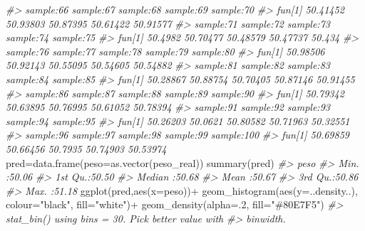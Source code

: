 \documentclass[
]{book}
\newenvironment{Shaded}{\begin{snugshade}}{\end{snugshade}}
\newcommand{\AttributeTok}[1]{\textcolor[rgb]{0.77,0.63,0.00}{#1}}
\newcommand{\CommentTok}[1]{\textcolor[rgb]{0.56,0.35,0.01}{\textit{#1}}}
\newcommand{\DecValTok}[1]{\textcolor[rgb]{0.00,0.00,0.81}{#1}}
\newcommand{\FunctionTok}[1]{\textcolor[rgb]{0.00,0.00,0.00}{#1}}
\newcommand{\NormalTok}[1]{#1}
\newcommand{\OtherTok}[1]{\textcolor[rgb]{0.56,0.35,0.01}{#1}}
\newcommand{\SpecialCharTok}[1]{\textcolor[rgb]{0.00,0.00,0.00}{#1}}
\newcommand{\StringTok}[1]{\textcolor[rgb]{0.31,0.60,0.02}{#1}}
\begin{document}
\begin{Shaded}
\begin{Highlighting}[]
\CommentTok{\#\textgreater{}        sample:66 sample:67 sample:68 sample:69 sample:70}
\CommentTok{\#\textgreater{} fun[1]  50.41452  50.93803  50.87395  50.61422  50.91577}
\CommentTok{\#\textgreater{}        sample:71 sample:72 sample:73 sample:74 sample:75}
\CommentTok{\#\textgreater{} fun[1]   50.4982  50.70477  50.48579  50.47737    50.434}
\CommentTok{\#\textgreater{}        sample:76 sample:77 sample:78 sample:79 sample:80}
\CommentTok{\#\textgreater{} fun[1]  50.98506  50.92143  50.55095  50.54605  50.54882}
\CommentTok{\#\textgreater{}        sample:81 sample:82 sample:83 sample:84 sample:85}
\CommentTok{\#\textgreater{} fun[1]  50.28867  50.88754  50.70405  50.87146  50.91455}
\CommentTok{\#\textgreater{}        sample:86 sample:87 sample:88 sample:89 sample:90}
\CommentTok{\#\textgreater{} fun[1]  50.79342  50.63895  50.76995  50.61052  50.78394}
\CommentTok{\#\textgreater{}        sample:91 sample:92 sample:93 sample:94 sample:95}
\CommentTok{\#\textgreater{} fun[1]  50.26203   50.0621  50.80582  50.71963  50.32551}
\CommentTok{\#\textgreater{}        sample:96 sample:97 sample:98 sample:99 sample:100}
\CommentTok{\#\textgreater{} fun[1]  50.69859  50.66456   50.7935  50.74903   50.53974}
\NormalTok{pred}\OtherTok{=}\FunctionTok{data.frame}\NormalTok{(}\AttributeTok{peso=}\FunctionTok{as.vector}\NormalTok{(peso\_real))}
\FunctionTok{summary}\NormalTok{(pred)}
\CommentTok{\#\textgreater{}       peso      }
\CommentTok{\#\textgreater{}  Min.   :50.06  }
\CommentTok{\#\textgreater{}  1st Qu.:50.50  }
\CommentTok{\#\textgreater{}  Median :50.68  }
\CommentTok{\#\textgreater{}  Mean   :50.67  }
\CommentTok{\#\textgreater{}  3rd Qu.:50.86  }
\CommentTok{\#\textgreater{}  Max.   :51.18}
\FunctionTok{ggplot}\NormalTok{(pred,}\FunctionTok{aes}\NormalTok{(}\AttributeTok{x=}\NormalTok{peso))}\SpecialCharTok{+}
  \FunctionTok{geom\_histogram}\NormalTok{(}\FunctionTok{aes}\NormalTok{(}\AttributeTok{y=}\NormalTok{..density..), }\AttributeTok{colour=}\StringTok{"black"}\NormalTok{, }\AttributeTok{fill=}\StringTok{"white"}\NormalTok{)}\SpecialCharTok{+}
  \FunctionTok{geom\_density}\NormalTok{(}\AttributeTok{alpha=}\NormalTok{.}\DecValTok{2}\NormalTok{, }\AttributeTok{fill=}\StringTok{"\#80E7F5"}\NormalTok{) }
\CommentTok{\#\textgreater{} \textasciigrave{}stat\_bin()\textasciigrave{} using \textasciigrave{}bins = 30\textasciigrave{}. Pick better value with}
\CommentTok{\#\textgreater{} \textasciigrave{}binwidth\textasciigrave{}.}
\end{Highlighting}
\end{Shaded}
\end{document}

